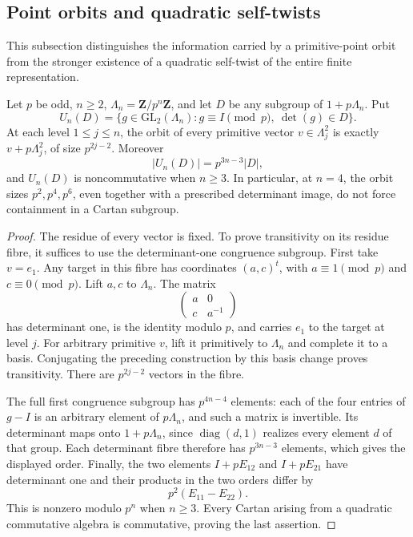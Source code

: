 \subsection{Point orbits and quadratic self-twists}
\label{sec:cartan-image-constraints}

This subsection distinguishes the information carried by a primitive-point
orbit from the stronger existence of a quadratic self-twist of the entire
finite representation.

\begin{proposition}
\label{prop:cartan-orbit-data}
Let $p$ be odd, $n\ge2$, $\Lambda_n=\mathbf Z/p^n\mathbf Z$, and let
$D$ be any subgroup of $1+p\Lambda_n$. Put
\[
 U_n(D)=\{g\in\mathrm{GL}_2(\Lambda_n):g\equiv I\pmod p,
                                  \ \det(g)\in D\}.
\]
At each level $1\le j\le n$, the orbit of every primitive vector
$v\in \Lambda_j^2$ is exactly $v+p\Lambda_j^2$, of size $p^{2j-2}$.
Moreover
\[
                  |U_n(D)|=p^{3n-3}|D|,
\]
and $U_n(D)$ is noncommutative when $n\ge3$.
In particular, at $n=4$, the orbit sizes $p^2,p^4,p^6$, even together
with a prescribed determinant image, do not force containment in a
Cartan subgroup.
\end{proposition}

\begin{proof}
The residue of every vector is fixed. To prove transitivity on its
residue fibre, it suffices to use the determinant-one congruence
subgroup. First take $v=e_1$. Any target in this fibre has coordinates
$(a,c)^t$, with $a\equiv1\pmod p$ and $c\equiv0\pmod p$.
Lift $a,c$ to $\Lambda_n$. The matrix
\[
                    \begin{pmatrix}a&0\\c&a^{-1}\end{pmatrix}
\]
has determinant one, is the identity modulo $p$, and carries $e_1$
to the target at level $j$. For arbitrary primitive $v$, lift it
primitively to $\Lambda_n$ and complete it to a basis. Conjugating the
preceding construction by this basis change proves transitivity.
There are $p^{2j-2}$ vectors in the fibre.

The full first congruence subgroup has $p^{4n-4}$ elements: each of
the four entries of $g-I$ is an arbitrary element of $p\Lambda_n$, and
such a matrix is invertible. Its determinant maps onto $1+p\Lambda_n$,
since $\operatorname{diag}(d,1)$ realizes every element $d$ of that
group. Each determinant fibre therefore has $p^{3n-3}$ elements,
which gives the displayed order. Finally, the two elements
$I+pE_{12}$ and $I+pE_{21}$ have determinant one and their products
in the two orders differ by
\[
                         p^2(E_{11}-E_{22}).
\]
This is nonzero modulo $p^n$ when $n\ge3$. Every Cartan arising from
a quadratic commutative algebra is commutative, proving the last
assertion.
\end{proof}

